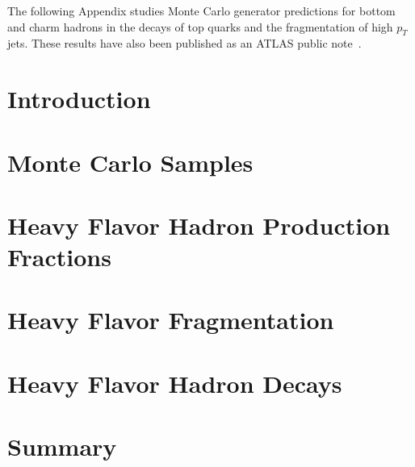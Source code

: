 The following Appendix studies Monte Carlo generator predictions for bottom and charm hadrons in the decays of top quarks and the fragmentation of high $p_T$ jets. These results have also been published as an ATLAS public note~\cite{ATL-PHYS-PUB-2014-008}.

\section{Introduction}
\label{sec:intro}


\section{Monte Carlo Samples}
\label{sec:mcsamples}


\section{Heavy Flavor Hadron Production Fractions}
\label{sec:prod}

\section{Heavy Flavor Fragmentation}
\label{sec:frag}
\label{sec:fragmentation}


\section{Heavy Flavor Hadron Decays}
\label{sec:decay}


\section{Summary}
\label{sec:conclusion}


